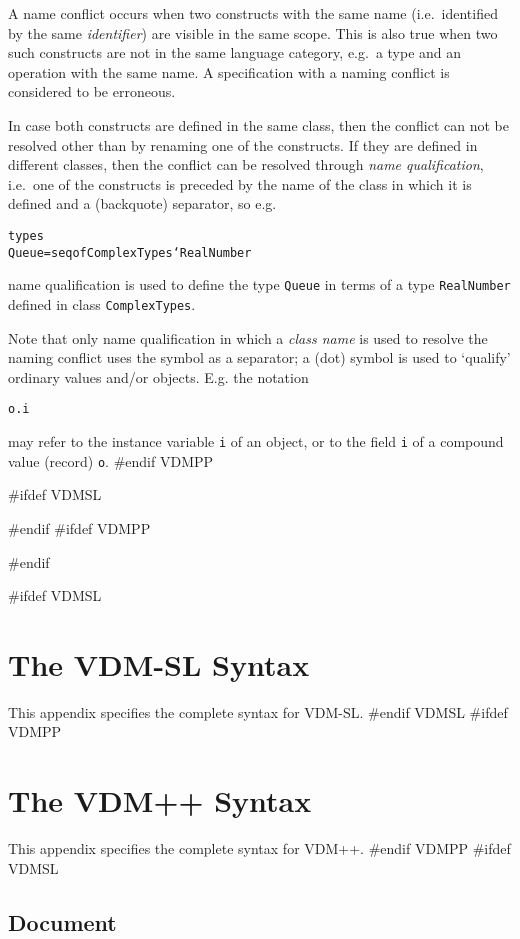 \documentclass[\pformat,12pt]{article}
\newcommand{\vdmpp}{VDM++}
\begin{document}
A name conflict occurs when two constructs with the same name
(i.e.\ identified by the same {\em identifier}) are visible in the
same scope.  This is also true when two such constructs are not in the
same language category, e.g.\ a type and an operation with the same name.
A specification with a naming conflict is considered to be erroneous.

In case both constructs are defined in the same class, then the conflict can
not be resolved other than by renaming one of the constructs.
If they are defined in different classes, then the conflict can be resolved
through {\em name qualification}, i.e.\ one of the constructs is
preceded by the name of the class in which it is defined and
a  (backquote) separator, so e.g.
  \begin{alltt}
    types
      Queue = seq of ComplexTypes`RealNumber
  \end{alltt}
name qualification is used to define the type {\tt Queue} in terms of a
type {\tt RealNumber} defined in class {\tt ComplexTypes}.

Note that only name qualification in which a {\em class name} is used to
resolve the naming conflict uses the  symbol as a separator; a
 (dot) symbol is used to `qualify' ordinary values and/or objects.
E.g. the notation
  \begin{alltt}
    o.i
  \end{alltt}
may refer to the instance variable {\tt i} of an object, or to the
field {\tt i} of a compound value (record) {\tt o}.
#endif VDMPP


\newpage


#ifdef VDMSL

#endif
#ifdef VDMPP

#endif

\newpage
\appendix


#ifdef VDMSL
\section{The  VDM-SL Syntax} \label{app-a}
This appendix specifies the complete syntax for 
VDM-SL.
#endif VDMSL
#ifdef VDMPP
\section{The  VDM++ Syntax} \label{app-a}
This appendix specifies the complete syntax for 
\vdmpp.
#endif VDMPP
#ifdef VDMSL
\subsection{Document}
\end{document}
